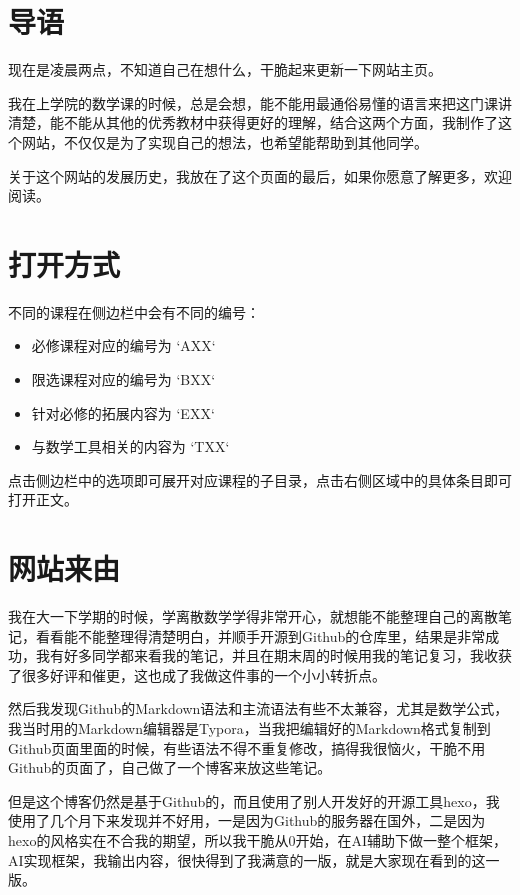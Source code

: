 
\section{导语}
现在是凌晨两点，不知道自己在想什么，干脆起来更新一下网站主页。

我在上学院的数学课的时候，总是会想，能不能用最通俗易懂的语言来把这门课讲清楚，能不能从其他的优秀教材中获得更好的理解，结合这两个方面，我制作了这个网站，不仅仅是为了实现自己的想法，也希望能帮助到其他同学。

关于这个网站的发展历史，我放在了这个页面的最后，如果你愿意了解更多，欢迎阅读。
\section{打开方式}

不同的课程在侧边栏中会有不同的编号：

\begin{itemize}
\item 必修课程对应的编号为 `AXX`
\item 限选课程对应的编号为 `BXX`
\item 针对必修的拓展内容为 `EXX`
\item 与数学工具相关的内容为 `TXX`
\end{itemize}

点击侧边栏中的选项即可展开对应课程的子目录，点击右侧区域中的具体条目即可打开正文。

\section{网站来由}

我在大一下学期的时候，学离散数学学得非常开心，就想能不能整理自己的离散笔记，看看能不能整理得清楚明白，并顺手开源到Github的仓库里，结果是非常成功，我有好多同学都来看我的笔记，并且在期末周的时候用我的笔记复习，我收获了很多好评和催更，这也成了我做这件事的一个小小转折点。

然后我发现Github的Markdown语法和主流语法有些不太兼容，尤其是数学公式，我当时用的Markdown编辑器是Typora，当我把编辑好的Markdown格式复制到Github页面里面的时候，有些语法不得不重复修改，搞得我很恼火，干脆不用Github的页面了，自己做了一个博客来放这些笔记。

但是这个博客仍然是基于Github的，而且使用了别人开发好的开源工具hexo，我使用了几个月下来发现并不好用，一是因为Github的服务器在国外，二是因为hexo的风格实在不合我的期望，所以我干脆从0开始，在AI辅助下做一整个框架，AI实现框架，我输出内容，很快得到了我满意的一版，就是大家现在看到的这一版。

